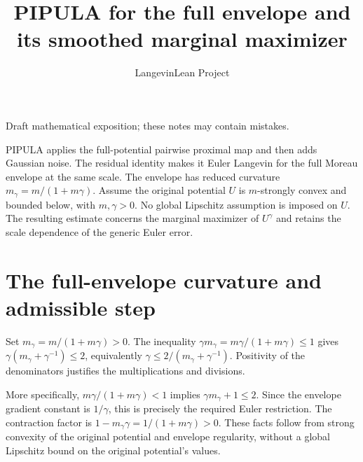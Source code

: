 \documentclass[11pt,a4paper]{article}
\title{\texorpdfstring{PIPULA for the full envelope and its smoothed marginal maximizer}{PIPULA for the full envelope and its smoothed marginal maximizer}}
\author{LangevinLean Project}
\date{}
\begin{document}
\maketitle
Draft mathematical exposition; these notes may contain mistakes.


PIPULA applies the full-potential pairwise proximal map and then adds Gaussian noise. The residual identity makes it Euler Langevin for the full Moreau envelope at the same scale. The envelope has reduced curvature \(m_\gamma=m/(1+m\gamma)\). Assume the original potential \(U\) is \(m\)-strongly convex and bounded below, with \(m,\gamma>0\). No global Lipschitz assumption is imposed on \(U\). The resulting estimate concerns the marginal maximizer of \(U^\gamma\) and retains the scale dependence of the generic Euler error.


\section{\texorpdfstring{The full-envelope curvature and admissible step}{The full-envelope curvature and admissible step}}


Set \(m_\gamma=m/(1+m\gamma)>0\). The inequality \(\gamma m_\gamma=m\gamma/(1+m\gamma)\le1\) gives \(\gamma(m_\gamma+\gamma^{-1})\le2\), equivalently \(\gamma\le2/(m_\gamma+\gamma^{-1})\). Positivity of the denominators justifies the multiplications and divisions.



More specifically, \(m\gamma/(1+m\gamma)<1\) implies \(\gamma m_\gamma+1\le2\). Since the envelope gradient constant is \(1/\gamma\), this is precisely the required Euler restriction. The contraction factor is \(1-m_\gamma\gamma=1/(1+m\gamma)>0\). These facts follow from strong convexity of the original potential and envelope regularity, without a global Lipschitz bound on the original potential’s values.
\end{document}
